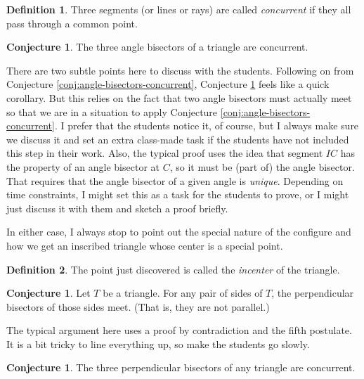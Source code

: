 \documentclass{tufte-handout}
\theoremstyle{definition}
\newtheorem{conjecture}[problem]{Conjecture}
\newtheorem*{definition}{Definition}
\begin{document}
\begin{definition}\label{defn:concurrent}
Three segments (or lines or rays) are called \emph{concurrent} if they all pass through a common point.
\end{definition}

\begin{conjecture}\label{conj:incenter-concurrent}
The three angle bisectors of a triangle are concurrent.
\end{conjecture}

There are two subtle points here to discuss with the students. Following on from Conjecture \ref{conj:angle-bisectors-concurrent}, Conjecture \ref{conj:incenter-concurrent} feels like a quick corollary. But this relies on
the fact that two angle bisectors must actually meet so that we are in a situation to apply Conjecture \ref{conj:angle-bisectors-concurrent}. I prefer that the students notice it, of course, but I always make sure we discuss it and set an extra class-made task if the students have not included this step in their work. Also, the typical proof uses the idea that segment $IC$ has the property of an angle bisector at $C$, so it must be (part of) the angle bisector. That requires that the angle bisector of a given angle is \emph{unique}. Depending on time constraints, I might set this as a task for the students to prove, or I might just discuss it with them and sketch a proof briefly.

In either case, I always stop to point out the special nature of the configure and how we get an inscribed triangle whose center is a special point.

\begin{definition}\label{defn:incenter}
The point just discovered is called the \emph{incenter} of the triangle.
\end{definition}

\begin{conjecture}\label{conj:meeting-perp-bisectors}
Let $T$ be a triangle. For any pair of sides of $T$, the perpendicular bisectors of those sides meet. (That is, they are not parallel.)
\end{conjecture}

The typical argument here uses a proof by contradiction and the fifth postulate. It is a bit tricky to line everything up, so make the students go slowly.

\begin{conjecture}\label{conj:circumcenter}
The three perpendicular bisectors of any triangle are concurrent.
\end{conjecture}
\end{document}
